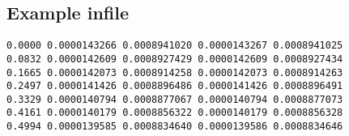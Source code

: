 \documentclass[12pt]{article}
\begin{document}
\subsection*{Example infile}

\begin{verbatim}
0.0000 0.0000143266 0.0008941020 0.0000143267 0.0008941025
0.0832 0.0000142609 0.0008927429 0.0000142609 0.0008927434
0.1665 0.0000142073 0.0008914258 0.0000142073 0.0008914263
0.2497 0.0000141426 0.0008896486 0.0000141426 0.0008896491
0.3329 0.0000140794 0.0008877067 0.0000140794 0.0008877073
0.4161 0.0000140179 0.0008856322 0.0000140179 0.0008856328
0.4994 0.0000139585 0.0008834640 0.0000139586 0.0008834646
\end{verbatim}
\end{document}
